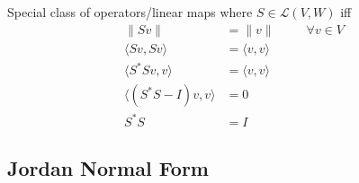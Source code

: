 \documentclass{article}
\begin{document}
Special class of operators/linear maps where $S \in \mathcal{L}(V, W)$ iff 
\begin{align*}
	\lVert Sv \rVert &= \lVert v \rVert \hspace{30pt} \forall v \in V \\
	\langle Sv, Sv \rangle &= \langle v, v \rangle \\
	\langle S^{*}Sv, v \rangle &= \langle v, v \rangle \\
	\langle (S^{*}S - I)v, v \rangle &= 0 \\
	S^{*}S &= I
\end{align*}
\begin{topic}
	\section*{Jordan Normal Form}
\end{topic}
\end{document}
